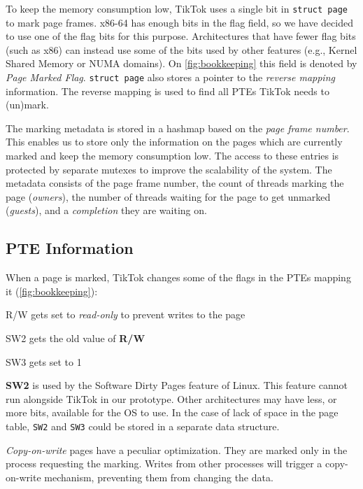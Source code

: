 \documentclass[conference]{IEEEtran}
\newcommand{\sysname}{TikTok}
\begin{document}
To keep the memory consumption low, \sysname{} uses a single bit in \texttt{struct
page} to mark page frames. x86-64 has enough bits in the flag
field, so we have decided to use one of the flag bits for this purpose.
Architectures that have fewer flag bits (such as x86) can instead use some of
the bits used by other features (e.g., Kernel Shared Memory or NUMA domains). On
\autoref{fig:bookkeeping} this field is denoted by \emph{Page Marked Flag}.
\texttt{struct page} also stores a pointer to the \emph{reverse mapping}
information. The reverse mapping is used to find all PTEs \sysname{} needs to
(un)mark.

The marking metadata is stored in a hashmap based on the \emph{page frame
number}. This enables us to store only the information on the pages which are
currently marked and keep the memory consumption low. The access to these entries
is protected by separate mutexes to improve the scalability of the system. The
metadata consists of the page frame number, the count of threads marking the page
(\emph{owners}), the number of threads waiting for the page to get unmarked
(\emph{guests}), and a \emph{completion} they are waiting on. 

\subsection{PTE Information}
\label{subsec:pageinfo}

When a page is marked, \sysname{} changes some of the flags in the PTEs mapping it
(\autoref{fig:bookkeeping}):

\begin{LaTeXdescription}
  \item[R/W] gets set to \emph{read-only} to prevent writes to the page
  \item[SW2] gets the old value of \textbf{R/W}
  \item[SW3] gets set to 1 
\end{LaTeXdescription}

\textbf{SW2} is used by the Software Dirty Pages
feature of Linux. This feature cannot run alongside \sysname{} in our prototype.
Other architectures may have less, or more bits, available for the OS to use. In
the case of lack of space in the page table, \texttt{SW2} and \texttt{SW3} could
be stored in a separate data structure.

\emph{Copy-on-write} pages have a peculiar optimization. They are marked only in
the process requesting the marking. Writes from other processes will trigger a
copy-on-write mechanism, preventing them from changing the data.
\end{document}
